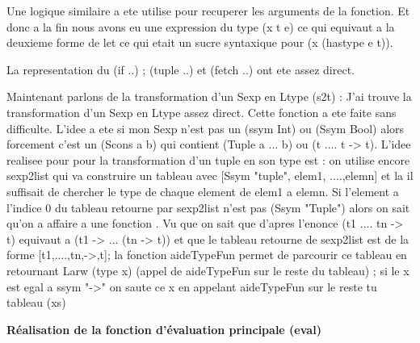 \documentclass{article}
\begin{document}
Une logique similaire a ete utilise pour recuperer les arguments de la fonction. Et donc a la fin nous avons eu une expression du type (x t e) ce qui equivaut a la deuxieme forme de let ce qui etait un sucre syntaxique pour (x (hastype e t)).

La representation du (if ..) ; (tuple ..) et (fetch ..) ont ete assez direct.
\vspace{.7 cm}

Maintenant parlons de la transformation d'un Sexp en Ltype (s2t) : J'ai trouve la transformation d'un Sexp en Ltype assez direct. Cette fonction a ete faite sans difficulte. L'idee a ete si mon Sexp n'est pas un (ssym Int) ou (Ssym Bool) alors forcement c'est un (Scons a b) qui contient (Tuple a ... b) ou (t .... t -> t). L'idee realisee pour pour la transformation d'un tuple en son type est : on utilise encore sexp2list qui va construire un tableau avec [Ssym "tuple", elem1, ....,elemn] et la il suffisait de chercher le type de chaque element de elem1 a elemn. Si l'element a l'indice 0 du tableau retourne par sexp2list n'est pas (Ssym "Tuple") alors on sait qu'on a affaire a une fonction . Vu que on sait que d'apres l'enonce (t1 .... tn -> t) equivaut a (t1 -> ... (tn -> t)) et que le tableau retourne de sexp2list est de la forme [t1,....,tn,->,t]; la fonction aideTypeFun permet de parcourir ce tableau en retournant Larw (type x) (appel de aideTypeFun sur le reste du tableau) ; si le x est egal a ssym "->" on saute ce x en appelant aideTypeFun sur le reste tu tableau (xs) \vspace{.7 cm}


\textbf {Réalisation de la fonction d'évaluation principale (eval)} \vspace{.7 cm}
\end{document}

